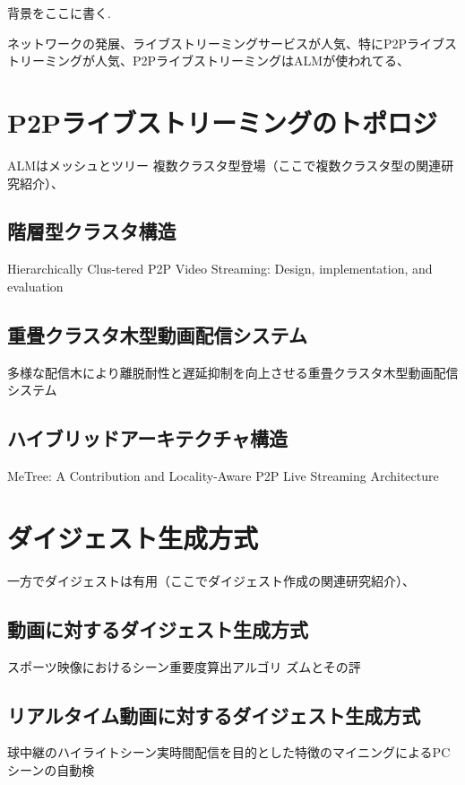 背景をここに書く.

ネットワークの発展、ライブストリーミングサービスが人気、特にP2Pライブストリーミングが人気、P2PライブストリーミングはALMが使われてる、

\section{P2Pライブストリーミングのトポロジ}
ALMはメッシュとツリー
複数クラスタ型登場（ここで複数クラスタ型の関連研究紹介）、

\subsection{階層型クラスタ構造}

Hierarchically Clus-tered P2P Video Streaming: Design, implementation, and evaluation

\subsection{重畳クラスタ木型動画配信システム}

多様な配信木により離脱耐性と遅延抑制を向上させる重畳クラスタ木型動画配信システム

\subsection{ハイブリッドアーキテクチャ構造}

MeTree: A Contribution and Locality-Aware P2P Live Streaming Architecture

\section{ダイジェスト生成方式}
一方でダイジェストは有用（ここでダイジェスト作成の関連研究紹介）、

\subsection{動画に対するダイジェスト生成方式}

スポーツ映像におけるシーン重要度算出アルゴリ
ズムとその評

\subsection{リアルタイム動画に対するダイジェスト生成方式}

球中継のハイライトシーン実時間配信を目的とした特徴のマイニングによるPCシーンの自動検


